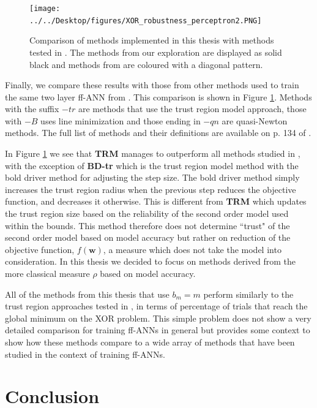 \documentclass[letterpaper,12pt,titlepage,oneside,final]{book}
\begin{document}
	\begin{figure}[h]
		\centering
		\texttt{[image: ../../Desktop/figures/XOR\_robustness\_perceptron2.PNG]}
		\caption{Comparison of methods implemented in this thesis with methods tested in \cite{Shepherd.1997}. The methods from our exploration are displayed as solid black and methods from \cite{Shepherd.1997} are coloured with a diagonal pattern.}
		\label{figure:XOR_comparison}
	\end{figure}
	Finally, we compare these results with those from other methods used to train the same two layer ff-ANN from \cite{Shepherd.1997}. This comparison is shown in Figure \ref{figure:XOR_comparison}. Methods with the suffix $-tr$ are methods that use the trust region model approach, those with $-B$ uses line minimization and those ending in $-qn$ are quasi-Newton methods. The full list of methods and their definitions are available on p. 134 of \cite{Shepherd.1997}.
	
	In Figure \ref{figure:XOR_comparison} we see that \textbf{TRM} manages to outperform all methods studied in \cite{Shepherd.1997}, with the exception of \textbf{BD-tr} which is the trust region model method with the bold driver method for adjusting the step size. The bold driver method simply increases the trust region radius when the previous step reduces the objective function, and decreases it otherwise. This is different from \textbf{TRM} which updates the trust region size based on the reliability of the second order model used within the bounds. This method therefore does not determine ``trust" of the second order model based on model accuracy but rather on reduction of the objective function, $f(\mathbf{w})$, a measure which does not take the model into consideration. In this thesis we decided to focus on methods derived from the more classical measure $\rho$ based on model accuracy. 
	
	All of the methods from this thesis that use $b_{m} = m$ perform similarly to the trust region approaches tested in \cite{Shepherd.1997}, in terms of percentage of trials that reach the global minimum on the XOR problem. This simple problem does not show a very detailed comparison for training ff-ANNs in general but provides some context to show how these methods compare to a wide array of methods that have been studied in the context of training ff-ANNs. 
	
	\chapter{Conclusion}
	
\end{document}
